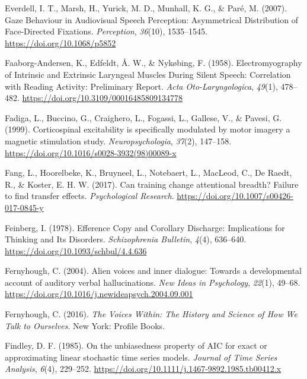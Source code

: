 \documentclass[a4paper,12pt,twoside,openright,oldfontcommands]{memoir}
\begin{document}
\leavevmode\hypertarget{ref-everdell_gaze_2007}{}%
Everdell, I. T., Marsh, H., Yurick, M. D., Munhall, K. G., \& Paré, M. (2007). Gaze Behaviour in Audiovisual Speech Perception: Asymmetrical Distribution of Face-Directed Fixations. \emph{Perception}, \emph{36}(10), 1535--1545. \url{https://doi.org/10.1068/p5852}

\leavevmode\hypertarget{ref-faaborg-andersen_electromyography_1958}{}%
Faaborg-Andersen, K., Edfeldt, Å. W., \& Nykøbing, F. (1958). Electromyography of Intrinsic and Extrinsic Laryngeal Muscles During Silent Speech: Correlation with Reading Activity: Preliminary Report. \emph{Acta Oto-Laryngologica}, \emph{49}(1), 478--482. \url{https://doi.org/10.3109/00016485809134778}

\leavevmode\hypertarget{ref-fadiga_corticospinal_1999}{}%
Fadiga, L., Buccino, G., Craighero, L., Fogassi, L., Gallese, V., \& Pavesi, G. (1999). Corticospinal excitability is specifically modulated by motor imagery a magnetic stimulation study. \emph{Neuropsychologia}, \emph{37}(2), 147--158. \url{https://doi.org/10.1016/s0028-3932(98)00089-x}

\leavevmode\hypertarget{ref-fang_can_2017}{}%
Fang, L., Hoorelbeke, K., Bruyneel, L., Notebaert, L., MacLeod, C., De Raedt, R., \& Koster, E. H. W. (2017). Can training change attentional breadth? Failure to find transfer effects. \emph{Psychological Research}. \url{https://doi.org/10.1007/s00426-017-0845-y}

\leavevmode\hypertarget{ref-feinberg_efference_1978}{}%
Feinberg, I. (1978). Efference Copy and Corollary Discharge: Implications for Thinking and Its Disorders. \emph{Schizophrenia Bulletin}, \emph{4}(4), 636--640. \url{https://doi.org/10.1093/schbul/4.4.636}

\leavevmode\hypertarget{ref-fernyhough_alien_2004}{}%
Fernyhough, C. (2004). Alien voices and inner dialogue: Towards a developmental account of auditory verbal hallucinations. \emph{New Ideas in Psychology}, \emph{22}(1), 49--68. \url{https://doi.org/10.1016/j.newideapsych.2004.09.001}

\leavevmode\hypertarget{ref-fernyhough_voices_2016}{}%
Fernyhough, C. (2016). \emph{The Voices Within: The History and Science of How We Talk to Ourselves}. New York: Profile Books.

\leavevmode\hypertarget{ref-findley_unbiasedness_1985}{}%
Findley, D. F. (1985). On the unbiasedness property of AIC for exact or approximating linear stochastic time series models. \emph{Journal of Time Series Analysis}, \emph{6}(4), 229--252. \url{https://doi.org/10.1111/j.1467-9892.1985.tb00412.x}
\end{document}
